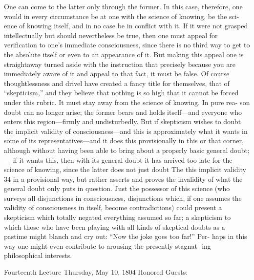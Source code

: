 One can come to the latter only through the former.
In this case, therefore, one
would in every circumstance be at one with the science of knowing, be the sci-
ence of knowing itself, and in no case be in conflict with it.
If it were not
grasped intellectually but should nevertheless be true, then one must appeal for
verification to one’s immediate consciousness, since there is no third way to get
to the absolute itself or even to an appearance of it.
But making this appeal one
is straightaway turned aside with the instruction that precisely because you are
immediately aware of it and appeal to that fact, it must be false.
Of course
thoughtlessness and drivel have created a fancy title for themselves, that of
“skepticism,” and they believe that nothing is so high that it cannot be forced
under this rubric.
It must stay away from the science of knowing.
In pure rea-
son doubt can no longer arise; the former bears and holds itself—and everyone
who enters this region—firmly and undisturbedly.
But if skepticism wishes to
doubt the implicit validity of consciousness—and this is approximately what it
wants in some of its representatives—and it does this provisionally in this or
that corner, although without having been able to bring about a properly basic
general doubt;— if it wants this, then with its general doubt it has
arrived too late for the science of knowing, since the latter does not just doubt
The
this implicit validity 34 in a provisional way, but rather asserts and proves the
invalidity of what the general doubt only puts in question.
Just the possessor of
this science (who surveys all disjunctions in consciousness, disjunctions which,
if one assumes the validity of consciousness in itself, become contradictions)
could present a skepticism which totally negated everything assumed so far; a
skepticism to which those who have been playing with all kinds of skeptical
doubts as a pastime might blanch and cry out: “Now the joke goes too far!” Per-
haps in this way one might even contribute to arousing the presently stagnat-
ing philosophical interests.

Fourteenth Lecture
Thursday, May 10, 1804
Honored Guests:

